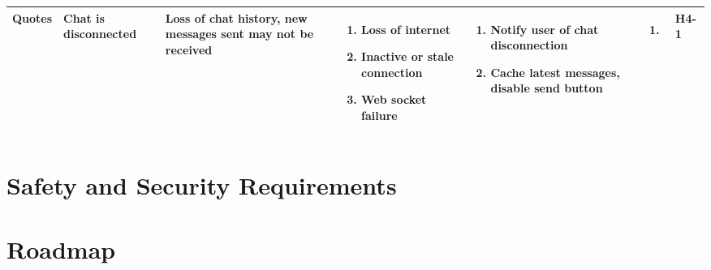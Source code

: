 \documentclass{article}
\begin{document}
\begin{landscape}
\begin{longtable}{|p{}|p{}|p{}|p{}|p{}|p{}|p{}|}
		\hline
		Quotes
		 & Chat is disconnected
		 & Loss of chat history, new messages sent may not be received
		 & \begin{enumerate}[label=\alph*., leftmargin=*]
			   \item Loss of internet
			   \item Inactive or stale connection
			   \item Web socket failure
		   \end{enumerate}
		 & \begin{enumerate}[label=\alph*., leftmargin=*]
			   \item Notify user of chat disconnection
			   \item Cache latest messages, disable send button
		   \end{enumerate}
		 & \begin{enumerate}[label=\alph*., leftmargin=*]
			   \item
		   \end{enumerate}
		 & H4-1                                                                                              \\
		\hline
	\end{longtable}
\end{landscape}

\section{Safety and Security Requirements}


\section{Roadmap}

\end{document}
